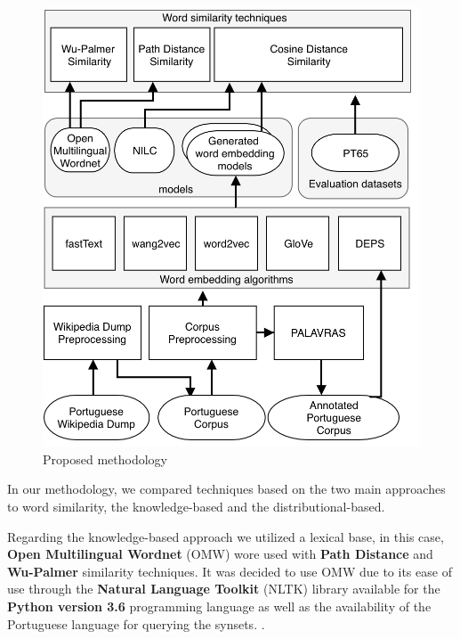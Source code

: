 \begin{figure}[h]
    \caption{Proposed methodology}
    \label{fig:arq}
    \centering%
    \begin{minipage}{.8\textwidth}
        \includegraphics[width=\textwidth]{arq.png}
    \end{minipage}
\end{figure}


In our methodology, we compared techniques based on the two main approaches to word similarity, the knowledge-based and the distributional-based. 

Regarding the knowledge-based approach we utilized a lexical base, in this case, \textbf{Open Multilingual Wordnet} (OMW) wore used with \textbf{Path Distance} and \textbf{Wu-Palmer} similarity techniques. It was decided to use OMW due to its ease of use through the \textbf{Natural Language Toolkit} (NLTK) library available for the \textbf{Python version 3.6} programming language as well as the availability of the Portuguese language for querying the synsets. \cite{Bond2013LinkingAE}.


